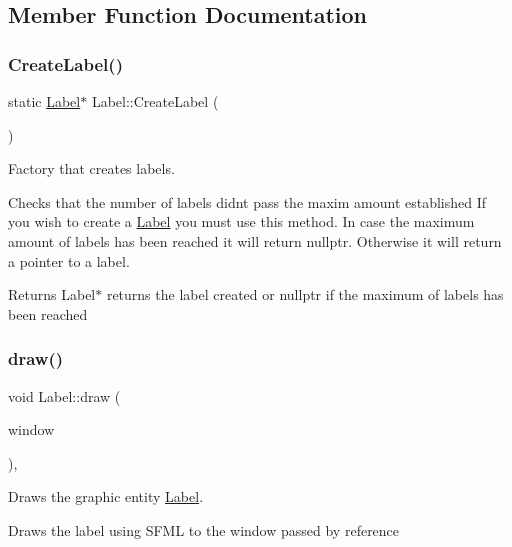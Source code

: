 \subsection{Member Function Documentation}
\mbox{\label{class_label_a9331db7ea12bb0bfa69910b9aa2229a4}} 
\subsubsection{\texorpdfstring{Create\+Label()}{CreateLabel()}}
{\footnotesize\ttfamily static \hyperlink{class_label}{Label}$\ast$ Label\+::\+Create\+Label (\begin{DoxyParamCaption}{ }\end{DoxyParamCaption})\hspace{0.3cm}{\ttfamily [static]}}



Factory that creates labels. 

Checks that the number of labels didn\textquotesingle{}t pass the maxim amount established If you wish to create a \hyperlink{class_label}{Label} you must use this method. In case the maximum amount of labels has been reached it will return nullptr. Otherwise it will return a pointer to a label.

\begin{DoxyReturn}{Returns}
Label$\ast$ returns the label created or nullptr if the maximum of labels has been reached 
\end{DoxyReturn}
\mbox{\label{class_label_aa0e2a948b68c7b70dde12b06b83a0cb1}} 
\subsubsection{\texorpdfstring{draw()}{draw()}}
{\footnotesize\ttfamily void Label\+::draw (\begin{DoxyParamCaption}\item[{sf\+::\+Render\+Window \&}]{window }\end{DoxyParamCaption})\hspace{0.3cm}{\ttfamily [override]}, {\ttfamily [virtual]}}



Draws the graphic entity \hyperlink{class_label}{Label}. 

Draws the label using S\+F\+ML to the window passed by reference

